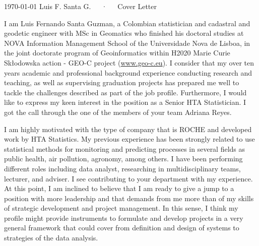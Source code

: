 \documentclass[11pt, a4paper]{awesome-cv}
\begin{document}
\makecvheader[R]

\makecvfooter
  {\today}
    {Luis F. Santa G.~~~·~~~Cover Letter}
  {}

\makelettertitle

\begin{cvletter}


I am Luis Fernando Santa Guzman, a Colombian statistician and cadastral and geodetic engineer with MSc in Geomatics who finished his doctoral studies at NOVA Information Management School of the Universidade Nova de Lisboa, in the joint doctorate program of Geoinformatics within H2020 Marie Curie Skłodowska action - GEO-C project (\url{www.geo-c.eu}). I consider that my over ten years academic and professional background experience conducting research and teaching, as well as supervising graduation projects has prepared me well to tackle the challenges described as part of the job profile. Furthermore, I would like to express my keen interest in the position as a Senior HTA Statistician. I got the call through the one of the members of your team Adriana Reyes.\par 
I am highly motivated with the type of company that is ROCHE and developed work by HTA Statistics. My previous experience has been strongly related to use statistical methods for monitoring and predicting processes in several fields as public health, air pollution, agronomy, among others. I have been performing different roles including data analyst, researching in multidisciplinary teams, lecturer, and adviser. I see contributing to your department with my experience. At this point, I am inclined to believe that I am ready to give a jump to a position with more leadership and that demands from me more than of my skills of strategic development and project management. In this sense, I think my profile might provide instruments to formulate and develop projects in a very general framework that could cover from definition and design of systems to strategies of the data analysis.\par

\end{cvletter}
\end{document}
